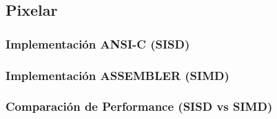     \subsection{Pixelar}
        \subsubsection{Implementación ANSI-C (SISD)}
        \subsubsection{Implementación ASSEMBLER (SIMD)}
        \subsubsection{Comparación de Performance (SISD vs SIMD)}
